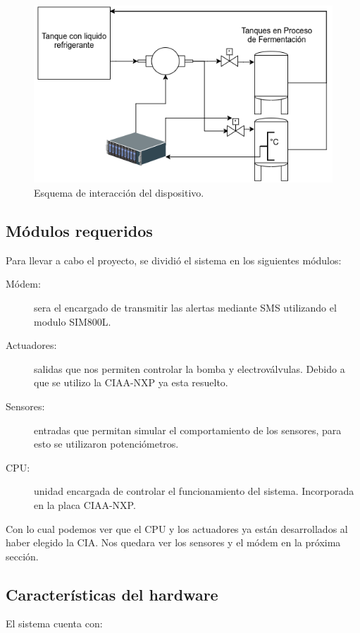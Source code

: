 \begin{figure}[!htb]
  \centering
  \includegraphics[scale=0.3]{./Figures/diagrama_del_sistema.png}
  \caption{Esquema de interacción del dispositivo.}
  \label{fig:diagrama_sistema}
\end{figure}

\subsection{ Módulos requeridos}
Para llevar a cabo el proyecto, se dividió el sistema en los siguientes módulos:
\begin{description}
  \item[Módem:] sera el encargado de transmitir las alertas mediante SMS utilizando el modulo SIM800L.
  \item[Actuadores:] salidas que nos permiten controlar la bomba y electroválvulas. Debido a que se utilizo la CIAA-NXP ya esta resuelto.
  \item[Sensores:] entradas que permitan simular el comportamiento de los sensores, para esto se utilizaron potenciómetros.
  \item[CPU:] unidad encargada de controlar el funcionamiento del sistema. Incorporada en la placa CIAA-NXP. 
\end{description}

Con lo cual podemos ver que el CPU y los actuadores ya están desarrollados al haber elegido la CIA. Nos quedara ver los sensores y el módem en la próxima sección.

\subsection{Características del hardware}
El sistema cuenta con:

